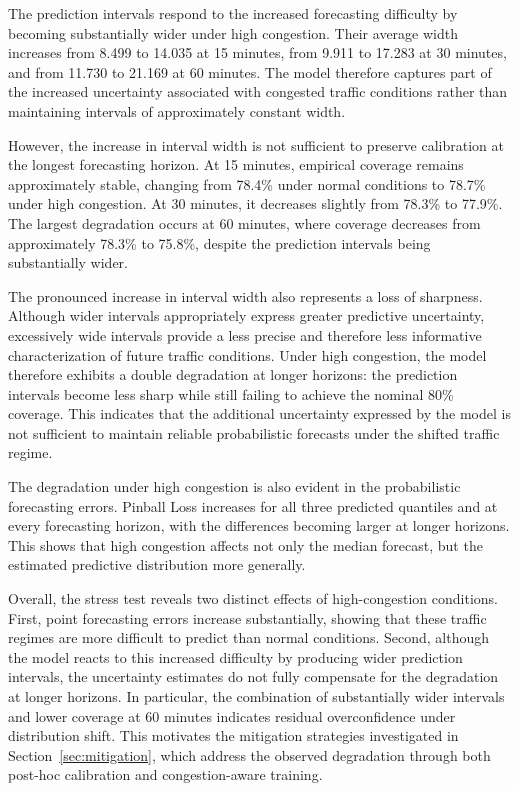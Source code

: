 The prediction intervals respond to the increased forecasting difficulty by
becoming substantially wider under high congestion. Their average width
increases from 8.499 to 14.035 at 15 minutes, from 9.911 to 17.283 at
30 minutes, and from 11.730 to 21.169 at 60 minutes. The model therefore
captures part of the increased uncertainty associated with congested traffic
conditions rather than maintaining intervals of approximately constant width.

However, the increase in interval width is not sufficient to preserve
calibration at the longest forecasting horizon. At 15 minutes, empirical
coverage remains approximately stable, changing from 78.4\% under normal
conditions to 78.7\% under high congestion. At 30 minutes, it decreases
slightly from 78.3\% to 77.9\%. The largest degradation occurs at 60 minutes,
where coverage decreases from approximately 78.3\% to 75.8\%, despite the
prediction intervals being substantially wider.

The pronounced increase in interval width also represents a loss of
sharpness. Although wider intervals appropriately express greater predictive
uncertainty, excessively wide intervals provide a less precise and therefore
less informative characterization of future traffic conditions. Under high
congestion, the model therefore exhibits a double degradation at longer
horizons: the prediction intervals become less sharp while still failing to
achieve the nominal 80\% coverage. This indicates that the additional
uncertainty expressed by the model is not sufficient to maintain reliable
probabilistic forecasts under the shifted traffic regime.

The degradation under high congestion is also evident in the probabilistic
forecasting errors. Pinball Loss increases for all three predicted quantiles
and at every forecasting horizon, with the differences becoming larger at
longer horizons. This shows that high congestion affects not only the median
forecast, but the estimated predictive distribution more generally.

Overall, the stress test reveals two distinct effects of high-congestion
conditions. First, point forecasting errors increase substantially, showing
that these traffic regimes are more difficult to predict than normal
conditions. Second, although the model reacts to this increased difficulty
by producing wider prediction intervals, the uncertainty estimates do not
fully compensate for the degradation at longer horizons. In particular, the
combination of substantially wider intervals and lower coverage at 60 minutes
indicates residual overconfidence under distribution shift.
This motivates the mitigation strategies investigated in
Section~\ref{sec:mitigation}, which address the observed degradation through
both post-hoc calibration and congestion-aware training.

